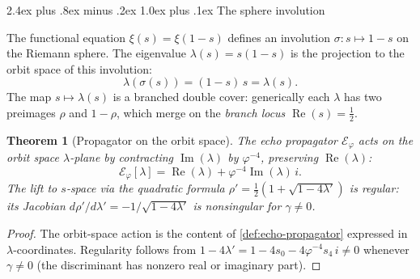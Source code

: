 \documentclass[11pt,a4paper]{article}
\makeatletter
\theoremstyle{plain}
\newtheorem{theorem}{Theorem}[section]
\theoremstyle{definition}
\theoremstyle{remark}
\numberwithin{equation}{section}
\newcommand{\vp}{\varphi}
\renewcommand{\subsection}{%
  \@startsection{subsection}{2}{0pt}%
    {2.4ex plus .8ex minus .2ex}%
    {1.0ex plus .1ex}%
    {\normalfont\Large\bfseries\color{headingAccent}}%
}
\makeatother
\begin{document}
\subsection{The sphere involution}
\label{subsec:sphere-involution}

The functional equation \(\xi(s)=\xi(1-s)\) defines an involution
\(\sigma\colon s\mapsto 1-s\) on the Riemann sphere.  The eigenvalue
\(\lambda(s)=s(1-s)\) is the projection to the orbit space of this
involution:
\[
  \lambda(\sigma(s))=(1-s)\,s=\lambda(s).
\]
The map \(s\mapsto\lambda(s)\) is a branched double cover: generically
each \(\lambda\) has two preimages \(\rho\) and \(1-\rho\), which
merge on the \emph{branch locus} \(\operatorname{Re}(s)=\tfrac12\).

\begin{theorem}[Propagator on the orbit space]
\label{thm:propagator-orbit-space}
The echo propagator \(\mathcal{E}_\vp\) acts on the orbit space
\(\lambda\)-plane by contracting \(\operatorname{Im}(\lambda)\) by
\(\vp^{-4}\), preserving \(\operatorname{Re}(\lambda)\):
\[
  \mathcal{E}_\vp[\lambda]=
  \operatorname{Re}(\lambda)+\vp^{-4}\operatorname{Im}(\lambda)\,i.
\]
The lift to \(s\)-space via the quadratic formula \(\rho'=\tfrac12(1+
\sqrt{1-4\lambda'})\) is regular: its Jacobian \(d\rho'/d\lambda'=
-1/\sqrt{1-4\lambda'}\) is nonsingular for \(\gamma\ne0\).
\end{theorem}

\begin{proof}
The orbit-space action is the content of \cref{def:echo-propagator}
expressed in \(\lambda\)-coordinates.  Regularity follows from
\(1-4\lambda'=1-4s_0-4\vp^{-4}s_4\,i\ne0\) whenever \(\gamma\ne0\)
(the discriminant has nonzero real or imaginary part).
\end{proof}
\end{document}
